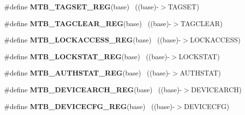 \begin{DoxyCompactItemize}
\item 
\hypertarget{group___m_t_b___register___accessor___macros_ga414e577f28da9f061c48b7312c0af794}{}\#define {\bfseries M\+T\+B\+\_\+\+T\+A\+G\+S\+E\+T\+\_\+\+R\+E\+G}(base)                                      ~((base)-\/$>$T\+A\+G\+S\+E\+T)\label{group___m_t_b___register___accessor___macros_ga414e577f28da9f061c48b7312c0af794}

\item 
\hypertarget{group___m_t_b___register___accessor___macros_ga62d2584598c15cb48b0b4fe291bd4a3e}{}\#define {\bfseries M\+T\+B\+\_\+\+T\+A\+G\+C\+L\+E\+A\+R\+\_\+\+R\+E\+G}(base)                                  ~((base)-\/$>$T\+A\+G\+C\+L\+E\+A\+R)\label{group___m_t_b___register___accessor___macros_ga62d2584598c15cb48b0b4fe291bd4a3e}

\item 
\hypertarget{group___m_t_b___register___accessor___macros_ga12183563bcebcfc8b82107780941270e}{}\#define {\bfseries M\+T\+B\+\_\+\+L\+O\+C\+K\+A\+C\+C\+E\+S\+S\+\_\+\+R\+E\+G}(base)                              ~((base)-\/$>$L\+O\+C\+K\+A\+C\+C\+E\+S\+S)\label{group___m_t_b___register___accessor___macros_ga12183563bcebcfc8b82107780941270e}

\item 
\hypertarget{group___m_t_b___register___accessor___macros_ga7a6b7214439d9309e60ef1c130eb5624}{}\#define {\bfseries M\+T\+B\+\_\+\+L\+O\+C\+K\+S\+T\+A\+T\+\_\+\+R\+E\+G}(base)                                  ~((base)-\/$>$L\+O\+C\+K\+S\+T\+A\+T)\label{group___m_t_b___register___accessor___macros_ga7a6b7214439d9309e60ef1c130eb5624}

\item 
\hypertarget{group___m_t_b___register___accessor___macros_ga589d384dfb47772beaa66d10ea28a5e4}{}\#define {\bfseries M\+T\+B\+\_\+\+A\+U\+T\+H\+S\+T\+A\+T\+\_\+\+R\+E\+G}(base)                                  ~((base)-\/$>$A\+U\+T\+H\+S\+T\+A\+T)\label{group___m_t_b___register___accessor___macros_ga589d384dfb47772beaa66d10ea28a5e4}

\item 
\hypertarget{group___m_t_b___register___accessor___macros_gacbb6c352d25d7cb7f695ac7741ae78f0}{}\#define {\bfseries M\+T\+B\+\_\+\+D\+E\+V\+I\+C\+E\+A\+R\+C\+H\+\_\+\+R\+E\+G}(base)                              ~((base)-\/$>$D\+E\+V\+I\+C\+E\+A\+R\+C\+H)\label{group___m_t_b___register___accessor___macros_gacbb6c352d25d7cb7f695ac7741ae78f0}

\item 
\hypertarget{group___m_t_b___register___accessor___macros_ga0aea42961121417709e9aa7625216071}{}\#define {\bfseries M\+T\+B\+\_\+\+D\+E\+V\+I\+C\+E\+C\+F\+G\+\_\+\+R\+E\+G}(base)                                ~((base)-\/$>$D\+E\+V\+I\+C\+E\+C\+F\+G)\label{group___m_t_b___register___accessor___macros_ga0aea42961121417709e9aa7625216071}


\end{DoxyCompactItemize}
